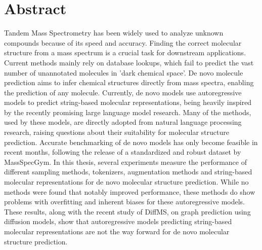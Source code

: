 \chapter{Abstract}
\label{chap:abstract}

Tandem Mass Spectrometry has been widely used to analyze unknown compounds because of its speed and accuracy.
Finding the correct molecular structure from a mass spectrum is a crucial task for downstream applications.
Current methods mainly rely on database lookups, which fail to predict the vast number of unannotated molecules in 'dark chemical space'.
De novo molecule prediction aims to infer chemical structures directly from mass spectra, enabling the prediction of any molecule.
Currently, de novo models use autoregressive models to predict string-based molecular representations, being heavily inspired by the recently promising large language model research.
Many of the methods, used by these models, are directly adopted from natural language processing research, raising questions about their suitability for molecular structure prediction.
Accurate benchmarking of de novo models has only become feasible in recent months, following the release of a standardized and robust dataset by MassSpecGym.
In this thesis, several experiments measure the performance of different sampling methods, tokenizers, augmentation methods and string-based molecular representations for de novo molecular structure prediction.
While no methods were found that notably improved performance, these methods do show problems with overfitting and inherent biases for these autoregressive models.
These results, along with the recent study of DiffMS, on graph prediction using diffusion models, show that autoregressive models predicting string-based molecular representations are not the way forward for de novo molecular structure prediction.
